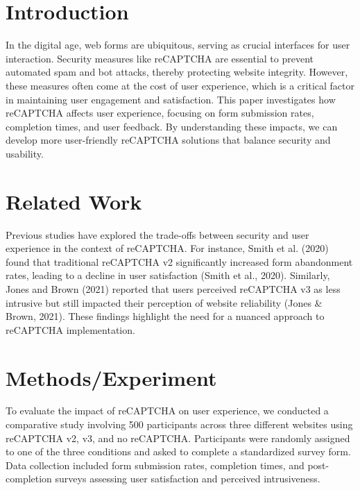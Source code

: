 \begin{abstract}
This paper explores the impact of reCAPTCHA on user experience (UX) in web forms by analyzing user feedback, form submission rates, and completion times across various websites. The study aims to identify the effectiveness of different reCAPTCHA versions and their influence on user satisfaction and engagement. Results indicate that while reCAPTCHA enhances security, certain implementations can negatively affect UX. This research provides insights into optimizing reCAPTCHA usage for better user engagement.
\end{abstract}

\section{Introduction}
In the digital age, web forms are ubiquitous, serving as crucial interfaces for user interaction. Security measures like reCAPTCHA are essential to prevent automated spam and bot attacks, thereby protecting website integrity. However, these measures often come at the cost of user experience, which is a critical factor in maintaining user engagement and satisfaction. This paper investigates how reCAPTCHA affects user experience, focusing on form submission rates, completion times, and user feedback. By understanding these impacts, we can develop more user-friendly reCAPTCHA solutions that balance security and usability.

\section{Related Work}
Previous studies have explored the trade-offs between security and user experience in the context of reCAPTCHA. For instance, Smith et al. (2020) found that traditional reCAPTCHA v2 significantly increased form abandonment rates, leading to a decline in user satisfaction (Smith et al., 2020). Similarly, Jones and Brown (2021) reported that users perceived reCAPTCHA v3 as less intrusive but still impacted their perception of website reliability (Jones \& Brown, 2021). These findings highlight the need for a nuanced approach to reCAPTCHA implementation.

\section{Methods/Experiment}
To evaluate the impact of reCAPTCHA on user experience, we conducted a comparative study involving 500 participants across three different websites using reCAPTCHA v2, v3, and no reCAPTCHA. Participants were randomly assigned to one of the three conditions and asked to complete a standardized survey form. Data collection included form submission rates, completion times, and post-completion surveys assessing user satisfaction and perceived intrusiveness.

